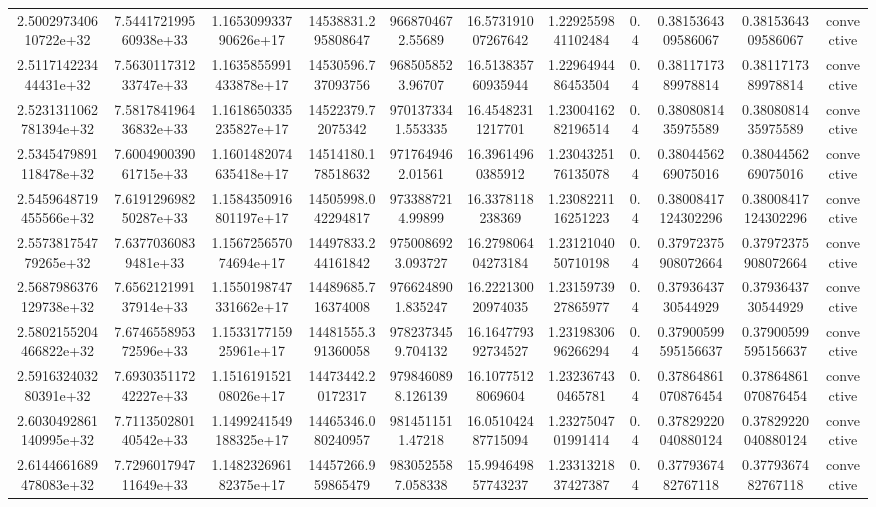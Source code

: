 \begin{table}
\begin{tabular}{ccccccccccc}
2.500297340610722e+32 & 7.544172199560938e+33 & 1.165309933790626e+17 & 14538831.295808647 & 9668704672.55689 & 16.573191007267642 & 1.2292559841102484 & 0.4 & 0.3815364309586067 & 0.3815364309586067 & convective \\
2.511714223444431e+32 & 7.563011731233747e+33 & 1.1635855991433878e+17 & 14530596.737093756 & 9685058523.96707 & 16.513835760935944 & 1.2296494486453504 & 0.4 & 0.3811717389978814 & 0.3811717389978814 & convective \\
2.5231311062781394e+32 & 7.581784196436832e+33 & 1.1618650335235827e+17 & 14522379.72075342 & 9701373341.553335 & 16.45482311217701 & 1.2300416282196514 & 0.4 & 0.3808081435975589 & 0.3808081435975589 & convective \\
2.5345479891118478e+32 & 7.600490039061715e+33 & 1.1601482074635418e+17 & 14514180.178518632 & 9717649462.01561 & 16.39614960385912 & 1.2304325176135078 & 0.4 & 0.3804456269075016 & 0.3804456269075016 & convective \\
2.5459648719455566e+32 & 7.619129698250287e+33 & 1.1584350916801197e+17 & 14505998.042294817 & 9733887214.99899 & 16.3378118238369 & 1.2308221116251223 & 0.4 & 0.38008417124302296 & 0.38008417124302296 & convective \\
2.557381754779265e+32 & 7.63770360839481e+33 & 1.156725657074694e+17 & 14497833.244161842 & 9750086923.093727 & 16.279806404273184 & 1.2312104050710198 & 0.4 & 0.37972375908072664 & 0.37972375908072664 & convective \\
2.5687986376129738e+32 & 7.656212199137914e+33 & 1.1550198747331662e+17 & 14489685.716374008 & 9766248901.835247 & 16.222130020974035 & 1.2315973927865977 & 0.4 & 0.3793643730544929 & 0.3793643730544929 & convective \\
2.5802155204466822e+32 & 7.674655895372596e+33 & 1.153317715925961e+17 & 14481555.391360058 & 9782373459.704132 & 16.164779392734527 & 1.2319830696266294 & 0.4 & 0.37900599595156637 & 0.37900599595156637 & convective \\
2.591632403280391e+32 & 7.693035117242227e+33 & 1.151619152108026e+17 & 14473442.20172317 & 9798460898.126139 & 16.10775128069604 & 1.232367430465781 & 0.4 & 0.37864861070876454 & 0.37864861070876454 & convective \\
2.6030492861140995e+32 & 7.711350280140542e+33 & 1.1499241549188325e+17 & 14465346.080240957 & 9814511511.47218 & 16.051042487715094 & 1.2327504701991414 & 0.4 & 0.37829220040880124 & 0.37829220040880124 & convective \\
2.6144661689478083e+32 & 7.729601794711649e+33 & 1.148232696182375e+17 & 14457266.959865479 & 9830525587.058338 & 15.994649857743237 & 1.2331321837427387 & 0.4 & 0.3779367482767118 & 0.3779367482767118 & convective \\

\end{tabular}
\end{table}

